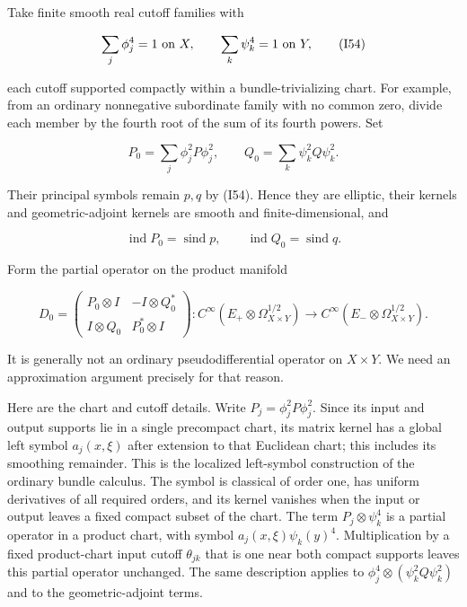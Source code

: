 \documentclass[
  11pt,
]{article}
\begin{document}
Take finite smooth real cutoff families with

\[
 \sum_j\phi_j^4=1\ \hbox{on }X,\qquad
 \sum_k\psi_k^4=1\ \hbox{on }Y,
 \tag{I54}
\]

each cutoff supported compactly within a bundle-trivializing chart. For
example, from an ordinary nonnegative subordinate family with no common
zero, divide each member by the fourth root of the sum of its fourth
powers. Set

\[
 P_0=\sum_j\phi_j^2P\phi_j^2,\qquad
 Q_0=\sum_k\psi_k^2Q\psi_k^2.
 \tag{I55}
\]

Their principal symbols remain \(p,q\) by (I54). Hence they are
elliptic, their kernels and geometric-adjoint kernels are smooth and
finite-dimensional, and

\[
 \operatorname{ind}P_0=\operatorname{sind}p,\qquad
 \operatorname{ind}Q_0=\operatorname{sind}q.
 \tag{I56}
\]

Form the partial operator on the product manifold

\[
 D_0=\begin{pmatrix}
 P_0\otimes I&-I\otimes Q_0^*\\
 I\otimes Q_0&P_0^*\otimes I
 \end{pmatrix}:
 C^\infty(E_+\otimes\Omega_{X\times Y}^{1/2})
 \longrightarrow C^\infty(E_-\otimes\Omega_{X\times Y}^{1/2}).
 \tag{I57}
\]

It is generally not an ordinary pseudodifferential operator on
\(X\times Y\). We need an approximation argument precisely for that
reason.

Here are the chart and cutoff details. Write \(P_j=\phi_j^2P\phi_j^2\).
Since its input and output supports lie in a single precompact chart,
its matrix kernel has a global left symbol \(a_j(x,\xi)\) after
extension to that Euclidean chart; this includes its smoothing
remainder. This is the localized left-symbol construction of the
ordinary bundle calculus. The symbol is classical of order one, has
uniform derivatives of all required orders, and its kernel vanishes when
the input or output leaves a fixed compact subset of the chart. The term
\(P_j\otimes\psi_k^4\) is a partial operator in a product chart, with
symbol \(a_j(x,\xi)\psi_k(y)^4\). Multiplication by a fixed
product-chart input cutoff \(\theta_{jk}\) that is one near both compact
supports leaves this partial operator unchanged. The same description
applies to \(\phi_j^4\otimes(\psi_k^2Q\psi_k^2)\) and to the
geometric-adjoint terms.
\end{document}
